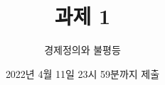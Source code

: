 \documentclass{article}
\begin{document}

\title{과제 1} %
\author{경제정의와 불평등} %
\date{2022년 4월 11일 23시 59분까지 제출}

\maketitle

%
\end{document}
